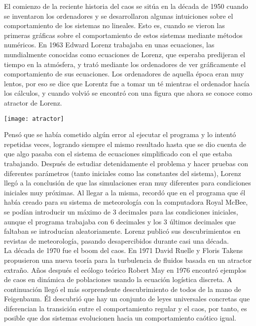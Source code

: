 \documentclass[12pt]{article}
\begin{document}
El comienzo de la reciente historia del caos se sitúa en la década de 1950 cuando se inventaron los ordenadores y se desarrollaron algunas intuiciones sobre el comportamiento de los sistemas no lineales. Esto es, cuando se vieron las primeras gráficas sobre el comportamiento de estos sistemas mediante métodos numéricos. En 1963 Edward Lorenz trabajaba en unas ecuaciones, las mundialmente conocidas como ecuaciones de Lorenz, que esperaba predijeran el tiempo en la atmósfera, y trató mediante los ordenadores de ver gráficamente el comportamiento de sus ecuaciones. Los ordenadores de aquella época eran muy lentos, por eso se dice que Lorentz fue a tomar un té mientras el ordenador hacía los cálculos, y cuando volvió se encontró con una figura que ahora se conoce como atractor de Lorenz.\\

\begin{center}
\texttt{[image: atractor]}
\end{center}

Pensó que se había cometido algún error al ejecutar el programa y lo intentó repetidas veces, logrando siempre el mismo resultado hasta que se dio cuenta de que algo pasaba con el sistema de ecuaciones simplificado con el que estaba trabajando. Después de estudiar detenidamente el problema y hacer pruebas con diferentes parámetros (tanto iniciales como las constantes del sistema), Lorenz llegó a la conclusión de que las simulaciones eran muy diferentes para condiciones iniciales muy próximas. Al llegar a la misma, recordó que en el programa que él había creado para su sistema de meteorología con la computadora Royal McBee, se podían introducir un máximo de 3 decimales para las condiciones iniciales, aunque el programa trabajaba con 6 decimales y los 3 últimos decimales que faltaban se introducían aleatoriamente. Lorenz publicó sus descubrimientos en revistas de meteorología, pasando desapercibidos durante casi una década.\\

La década de 1970 fue el boom del caos. En 1971 David Ruelle y Floris Takens propusieron una nueva teoría para la turbulencia de fluidos basada en un atractor extraño. Años después el ecólogo teórico Robert May en 1976 encontró ejemplos de caos en dinámica de poblaciones usando la ecuación logística discreta. A continuación llegó el más sorprendente descubrimiento de todos de la mano de Feigenbaum. Él descubrió que hay un conjunto de leyes universales concretas que diferencian la transición entre el comportamiento regular y el caos, por tanto, es posible que dos sistemas evolucionen hacia un comportamiento caótico igual.
\end{document}
